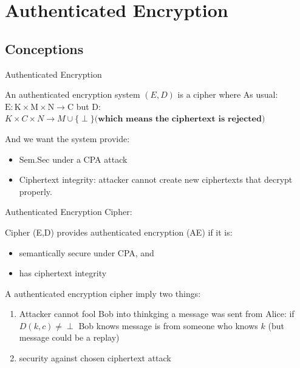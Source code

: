 \section{Authenticated Encryption}

\subsection{Conceptions}

\begin{definition}  Authenticated Encryption
    
    An authenticated encryption system $(E, D)$ is a cipher where
    As usual:
    $\mathrm{E}: \mathrm{K} \times \mathrm{M} \times \mathrm{N} \rightarrow \mathrm{C}$
    but
    D: $K \times C \times N \rightarrow M \cup\{\perp\} \textbf{(which means the ciphertext is rejected)}$

\end{definition}

And we want the system provide:
\begin{itemize}
    \item Sem.Sec under a CPA attack
    \item Ciphertext integrity: attacker cannot create new ciphertexts that decrypt properly.
\end{itemize}


\begin{definition}  Authenticated Encryption Cipher:

    Cipher (E,D) provides authenticated encryption (AE) if it is:
    \begin{itemize}
        \item semantically secure under CPA, and
        \item has ciphertext integrity
    \end{itemize}
    
\end{definition}

A authenticated encryption cipher imply two things:
\begin{enumerate}
    \item Attacker cannot fool Bob into thinkging a message was sent from Alice: if $D(k, c) \neq \perp$ Bob knows message is from someone who knows $k$ (but message could be a replay)
    \item security against chosen ciphertext attack
\end{enumerate}


